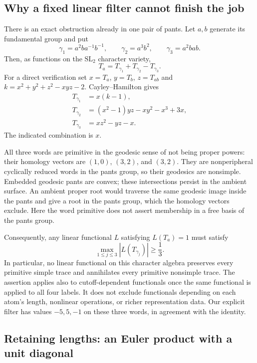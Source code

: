 \documentclass[11pt,a4paper]{article}
\numberwithin{equation}{section}
\theoremstyle{definition}
\theoremstyle{remark}
\begin{document}
\subsection{Why a fixed linear filter cannot finish the job}

There is an exact obstruction already in one pair of pants.
Let $a,b$ generate its fundamental group and put
\[
 \gamma_1=a^2ba^{-1}b^{-1},\qquad
 \gamma_2=a^3b^2,\qquad
 \gamma_3=a^2bab.
\]
Then, as functions on the $\mathrm{SL}_2$ character variety,
\begin{equation}
 \boxed{T_a=T_{\gamma_1}+T_{\gamma_2}-T_{\gamma_3}.}
 \label{eq:globalobstruction}
\end{equation}
For a direct verification set $x=T_a$, $y=T_b$, $z=T_{ab}$ and
$k=x^2+y^2+z^2-xyz-2$. Cayley--Hamilton gives
\begin{align*}
 T_{\gamma_1}&=x(k-1),\\
 T_{\gamma_2}&=(x^2-1)yz-xy^2-x^3+3x,\\
 T_{\gamma_3}&=xz^2-yz-x.
\end{align*}
The indicated combination is $x$.

All three words are primitive in the geodesic sense of not being
proper powers: their homology vectors are $(1,0)$, $(3,2)$, and
$(3,2)$. They are nonperipheral cyclically reduced words in the
pants group, so their geodesics are nonsimple. Embedded geodesic
pants are convex; these intersections persist in the ambient
surface. An ambient proper root would traverse the same geodesic
image inside the pants and give a root in the pants group, which
the homology vectors exclude. Here the word primitive does not assert membership in a
free basis of the pants group.

Consequently, any linear functional $L$ satisfying $L(T_a)=1$
must satisfy
\begin{equation}
 \max_{1\leq j\leq3}|L(T_{\gamma_j})|\geq\frac13.
 \label{eq:globalobstructionbound}
\end{equation}
In particular, no linear functional on this character algebra
preserves every primitive simple trace and annihilates every
primitive nonsimple trace. The assertion applies also to
cutoff-dependent functionals once the same functional is applied
to all four labels. It does not exclude functionals depending
on each atom's length, nonlinear operations, or richer
representation data. Our explicit filter has values $-5,5,-1$
on these three words, in agreement with the identity.

\subsection{Retaining lengths: an Euler product with a unit diagonal}
\end{document}
